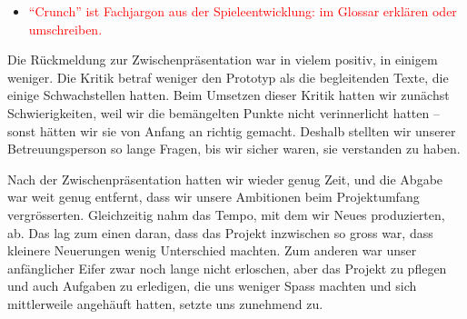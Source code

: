 \documentclass[../Main.tex]{subfiles}
\begin{document}
\begin{itemize}[leftmargin=1.5cm]
    \item \textcolor{red}{\enquote{Crunch} ist Fachjargon aus der Spieleentwicklung: im Glossar erklären oder umschreiben.}
\end{itemize}

Die Rückmeldung zur Zwischenpräsentation war in vielem positiv, in einigem weniger. Die Kritik betraf weniger den Prototyp als die begleitenden Texte, die einige Schwachstellen hatten. Beim Umsetzen dieser Kritik hatten wir zunächst Schwierigkeiten, weil wir die bemängelten Punkte nicht verinnerlicht hatten -- sonst hätten wir sie von Anfang an richtig gemacht. Deshalb stellten wir unserer Betreuungsperson so lange Fragen, bis wir sicher waren, sie verstanden zu haben.

Nach der Zwischenpräsentation hatten wir wieder genug Zeit, und die Abgabe war weit genug entfernt, dass wir unsere Ambitionen beim Projektumfang vergrösserten. Gleichzeitig nahm das Tempo, mit dem wir Neues produzierten, ab. Das lag zum einen daran, dass das Projekt inzwischen so gross war, dass kleinere Neuerungen wenig Unterschied machten. Zum anderen war unser anfänglicher Eifer zwar noch lange nicht erloschen, aber das Projekt zu pflegen und auch Aufgaben zu erledigen, die uns weniger Spass machten und sich mittlerweile angehäuft hatten, setzte uns zunehmend zu.
\end{document}
